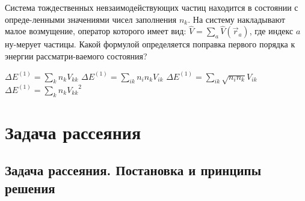 \documentclass[11pt,a4paper]{exam}
\begin{document}
\begin{questions}
\question Система тождественных невзаимодействующих частиц находится в состоянии с опреде-ленными значениями чисел заполнения ${n_k}$. На систему накладывают малое возмущение, оператор которого имеет вид: $\hat V = \sum\limits_a {\hat V({{\vec r}_a})} $, где индекс $a$ ну-мерует частицы. Какой формулой определяется поправка первого порядка к энергии рассматри-ваемого состояния?
\begin{choices}
\choice $\Delta {E^{(1)}} = \sum\limits_k {{n_k}{V_{kk}}} $   
\choice $\Delta {E^{(1)}} = \sum\limits_{ik} {{n_i}{n_k}{V_{ik}}} $ 
\choice $\Delta {E^{(1)}} = \sum\limits_{ik} {\sqrt {{n_i}{n_k}} {V_{ik}}} $ 
\choice $\Delta {E^{(1)}} = \sum\limits_k {{n_k}{V_{kk}}^2} $
\end{choices} 

\end{questions}


\section{ Задача рассеяния }

\subsection{ Задача рассеяния. Постановка и принципы решения }
\end{document}
